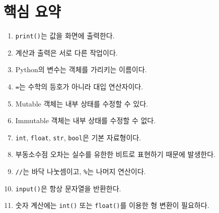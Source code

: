 \documentclass[11pt,a4paper]{article}
\begin{document}
\section{핵심 요약}

\begin{enumerate}
    \item \texttt{print()}는 값을 화면에 출력한다.
    \item 계산과 출력은 서로 다른 작업이다.
    \item Python의 변수는 객체를 가리키는 이름이다.
    \item \texttt{=}는 수학의 등호가 아니라 대입 연산자이다.
    \item Mutable 객체는 내부 상태를 수정할 수 있다.
    \item Immutable 객체는 내부 상태를 수정할 수 없다.
    \item \texttt{int}, \texttt{float}, \texttt{str}, \texttt{bool}은 기본 자료형이다.
    \item 부동소수점 오차는 실수를 유한한 비트로 표현하기 때문에 발생한다.
    \item \texttt{//}는 바닥 나눗셈이고, \texttt{\%}는 나머지 연산이다.
    \item \texttt{input()}은 항상 문자열을 반환한다.
    \item 숫자 계산에는 \texttt{int()} 또는 \texttt{float()}를 이용한 형 변환이 필요하다.
\end{enumerate}
\end{document}
